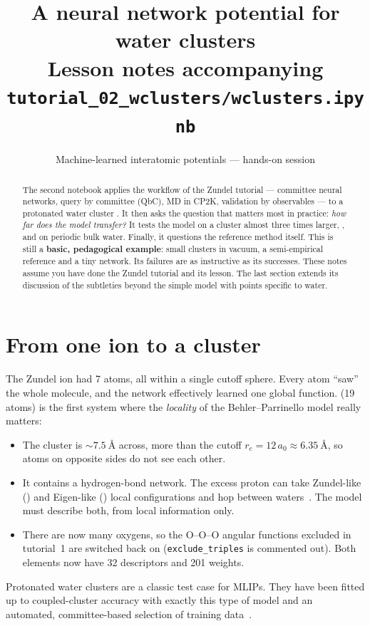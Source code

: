 \documentclass[11pt,a4paper]{article}
\title{\textbf{A neural network potential for water clusters}\\[4pt]
\large Lesson notes accompanying \texttt{tutorial\_02\_wclusters/wclusters.ipynb}}
\author{Machine-learned interatomic potentials --- hands-on session}
\date{}
\begin{document}
\maketitle

\begin{abstract}
The second notebook applies the workflow of the Zundel tutorial --- committee
neural networks, query by committee (QbC), MD in CP2K, validation by
observables --- to a protonated water cluster . It then asks the
question that matters most in practice: \emph{how far does the model
transfer?} It tests the model on a cluster almost three times larger,
, and on periodic bulk water. Finally, it questions the
reference method itself. This is still a \textbf{basic, pedagogical
example}: small clusters in vacuum, a semi-empirical reference and a tiny
network. Its failures are as instructive as its successes. These notes assume
you have done the Zundel tutorial and its lesson. The last section extends its
discussion of the subtleties beyond the simple model with points specific to
water.
\end{abstract}

\tableofcontents

\section{From one ion to a cluster}

The Zundel ion had 7 atoms, all within a single cutoff sphere. Every atom
``saw'' the whole molecule, and the network effectively learned one global
function.  (19 atoms) is the first system where the
\emph{locality} of the Behler--Parrinello model really matters:
\begin{itemize}[nosep]
  \item The cluster is $\sim\SI{7.5}{\angstrom}$ across, more than the cutoff
        $r_c = 12\,a_0 \approx \SI{6.35}{\angstrom}$, so atoms on opposite sides do
        not see each other.
  \item It contains a hydrogen-bond network. The excess proton can take
        Zundel-like () and Eigen-like () local
        configurations and hop between waters~\cite{Marx1999}. The model must
        describe both, from local information only.
  \item There are now many oxygens, so the O--O--O angular functions excluded
        in tutorial~1 are switched back on (\texttt{exclude\_triples} is
        commented out). Both elements now have 32 descriptors and 201 weights.
\end{itemize}
Protonated water clusters are a classic test case for MLIPs. They have been
fitted up to coupled-cluster accuracy with exactly this type of model and an
automated, committee-based selection of training
data~\cite{Schran2020cc}.
\end{document}
